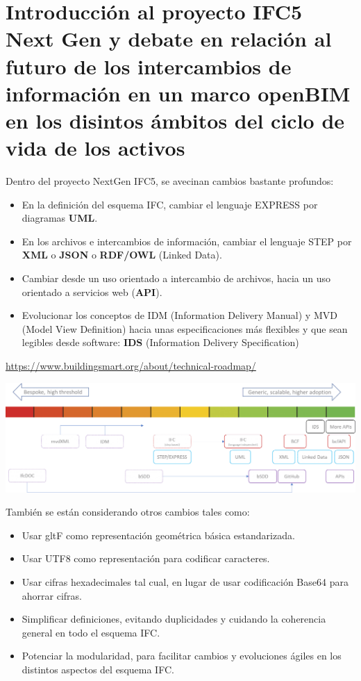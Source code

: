 \documentclass[spanish,10pt,a4paper,final,oneside]{article}
\begin{document}
\newpage
\section{Introducción al proyecto IFC5 Next Gen y debate en relación al futuro de los intercambios de información en un marco openBIM en los disintos ámbitos del ciclo de vida de los activos}

Dentro del proyecto NextGen IFC5, se avecinan cambios bastante profundos:

\begin{itemize}

\item En la definición del esquema IFC, cambiar el lenguaje EXPRESS por diagramas \textbf{UML}.

\item En los archivos e intercambios de información, cambiar el lenguaje STEP por \textbf{XML} o \textbf{JSON} o \textbf{RDF/OWL} (Linked Data).

\item Cambiar desde un uso orientado a intercambio de archivos, hacia un uso orientado a servicios web (\textbf{API}).

\item Evolucionar los conceptos de IDM (Information Delivery Manual) y MVD (Model View Definition) hacia unas especificaciones más flexibles y que sean legibles desde software: \textbf{IDS} (Information Delivery Specification) 

\end{itemize}

\url{https://www.buildingsmart.org/about/technical-roadmap/}

\includegraphics[width=\textwidth]{NextGen IFC5 roadmap}

También se están considerando otros cambios tales como:
\begin{itemize}
\item Usar gltF como representación geométrica básica estandarizada.
\item Usar UTF8 como representación para codificar caracteres.
\item Usar cifras hexadecimales tal cual, en lugar de usar codificación Base64 para ahorrar cifras.
\item Simplificar definiciones, evitando duplicidades y cuidando la coherencia general en todo el esquema IFC.
\item Potenciar la modularidad, para facilitar cambios y evoluciones ágiles en los distintos aspectos del esquema IFC.
\end{itemize}
\end{document}
